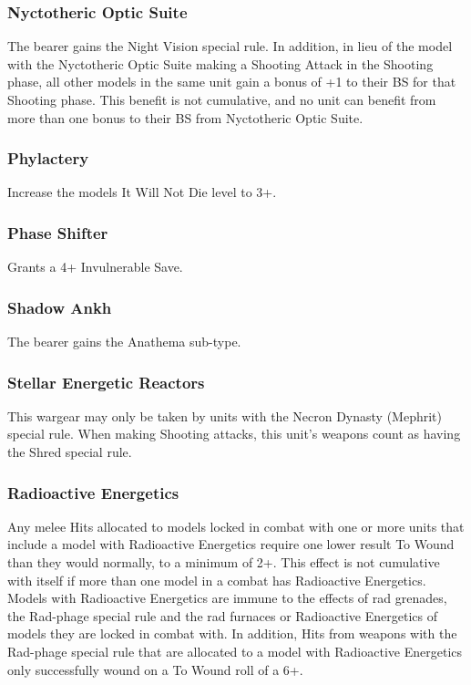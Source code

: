 \subsubsection{Nyctotheric Optic Suite} \label{Nyctotheric Optic Suite}

The bearer gains the Night Vision special rule. In addition, in lieu of the model with the Nyctotheric Optic Suite making a Shooting Attack in the Shooting phase, all other models in the same unit gain a bonus of +1 to their BS for that Shooting phase. This benefit is not cumulative, and no unit can benefit from more than one bonus to their BS from Nyctotheric Optic Suite.

\subsubsection{Phylactery} \label{Phylactery}

Increase the models It Will Not Die level to 3+.

\subsubsection{Phase Shifter} \label{Phase Shifter}

Grants a 4+ Invulnerable Save.

\subsubsection{Shadow Ankh} \label{Shadow Ankh}

The bearer gains the Anathema sub-type.

\subsubsection{Stellar Energetic Reactors} \label{Stellar Energetic Reactors}

This wargear may only be taken by units with the Necron Dynasty (Mephrit) special rule. When making Shooting attacks, this unit's weapons count as having the Shred special rule.

\subsubsection{Radioactive Energetics} \label{Radioactive Energetics}

Any melee Hits allocated to models locked in combat with one or more units that include a model with Radioactive Energetics require one lower result To Wound than they would normally, to a minimum of 2+. This effect is not cumulative with itself if more than one model in a combat has Radioactive Energetics. Models with Radioactive Energetics are immune to the effects of rad grenades, the Rad-phage special rule and the rad furnaces or Radioactive Energetics of models they are locked in combat with. In addition, Hits from weapons with the Rad-phage special rule that are allocated to a model with Radioactive Energetics only successfully wound on a To Wound roll of a 6+. 

